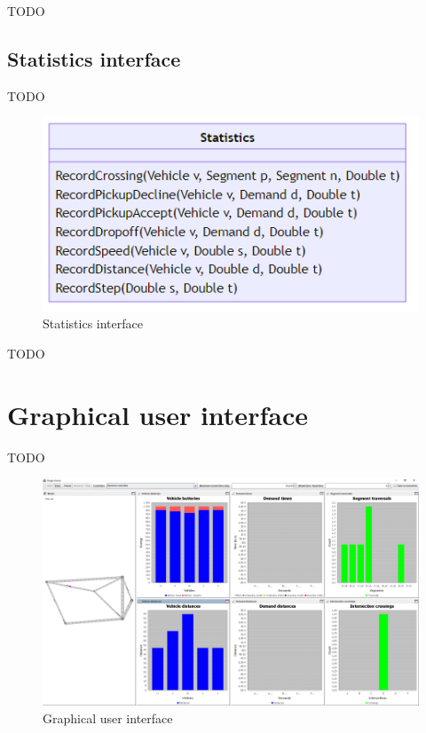 \documentclass[10pt,twocolumn]{article}
\begin{document}
TODO

\subsection{Statistics interface}
\label{sec:statistics-interface}

TODO

\begin{figure}[htbp]
    \includegraphics[width=\columnwidth]{../../diagrams/statistics/classes.png}
    \caption{Statistics interface}
    \label{fig:statistics-interface}
\end{figure}

TODO

\section{Graphical user interface}
\label{sec:gui}

TODO

\begin{figure}[tbp]
    \includegraphics[width=\textwidth]{../../screenshots/basic-simulation.png}
    \caption{Graphical user interface}
    \label{fig:gui}
\end{figure}
\end{document}
